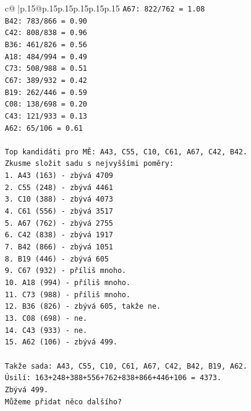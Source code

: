 \documentclass{article}
\begin{document}
{\begin{supertabular}{c@{$\;$}|p{.15\linewidth}@{}p{.15\linewidth}p{.15\linewidth}p{.15\linewidth}p{.15\linewidth}p{.15\linewidth}}
{{{\texttt{A67: 822/762 = 1.08} \\
\texttt{B42: 783/866 = 0.90} \\
\texttt{C42: 808/838 = 0.96} \\
\texttt{B36: 461/826 = 0.56} \\
\texttt{A18: 484/994 = 0.49} \\
\texttt{C73: 508/988 = 0.51} \\
\texttt{C67: 389/932 = 0.42} \\
\texttt{B19: 262/446 = 0.59} \\
\texttt{C08: 138/698 = 0.20} \\
\texttt{C43: 121/933 = 0.13} \\
\texttt{A62: 65/106 = 0.61} \\
\\ 
\texttt{Top kandidáti pro MĚ: A43, C55, C10, C61, A67, C42, B42.} \\
\texttt{Zkusme složit sadu s nejvyššími poměry:} \\
\texttt{1. A43 (163) {-} zbývá 4709} \\
\texttt{2. C55 (248) {-} zbývá 4461} \\
\texttt{3. C10 (388) {-} zbývá 4073} \\
\texttt{4. C61 (556) {-} zbývá 3517} \\
\texttt{5. A67 (762) {-} zbývá 2755} \\
\texttt{6. C42 (838) {-} zbývá 1917} \\
\texttt{7. B42 (866) {-} zbývá 1051} \\
\texttt{8. B19 (446) {-} zbývá 605} \\
\texttt{9. C67 (932) {-} příliš mnoho.} \\
\texttt{10. A18 (994) {-} příliš mnoho.} \\
\texttt{11. C73 (988) {-} příliš mnoho.} \\
\texttt{12. B36 (826) {-} zbývá 605, takže ne.} \\
\texttt{13. C08 (698) {-} ne.} \\
\texttt{14. C43 (933) {-} ne.} \\
\texttt{15. A62 (106) {-} zbývá 499.} \\
\\ 
\texttt{Takže sada: A43, C55, C10, C61, A67, C42, B42, B19, A62.} \\
\texttt{Úsilí: 163+248+388+556+762+838+866+446+106 = 4373.} \\
\texttt{Zbývá 499.} \\
\texttt{Můžeme přidat něco dalšího?} \\
}}}
\end{supertabular}}
\end{document}
